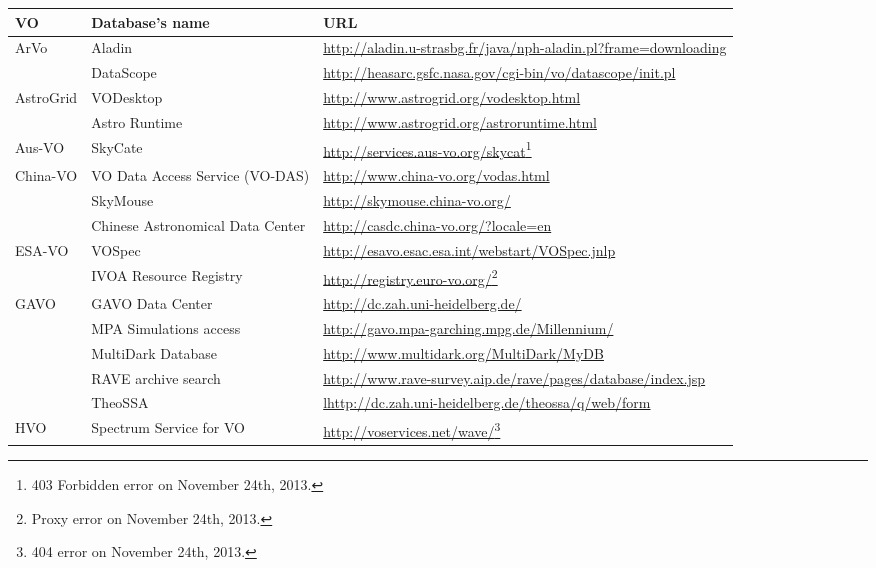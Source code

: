 \begin{table*}[h!t]
    \centering
    \begin{tabular}{|l|p{9cm}|p{6cm}|}
    \hline
    \textbf{VO} & \textbf{Database's name} & \textbf{URL} \\
    \hline
    \multirow{2}{*}{ArVo} & Aladin
    & \url{http://aladin.u-strasbg.fr/java/nph-aladin.pl?frame=downloading} \\
    \cline{2-3}
     & DataScope
     & \url{http://heasarc.gsfc.nasa.gov/cgi-bin/vo/datascope/init.pl} \\
     \hline
    \multirow{2}{*}{AstroGrid} & VODesktop
    & \url{http://www.astrogrid.org/vodesktop.html}\\
    \cline{2-3}
     & Astro Runtime & \url{http://www.astrogrid.org/astroruntime.html} \\
     \hline
    Aus-VO & SkyCate
    & \url{http://services.aus-vo.org/skycat}\footnote{403 Forbidden error on November 24th, 2013.} \\ 
    \hline
    \multirow{3}{*}{China-VO} & VO Data Access Service (VO-DAS)
    & \url{http://www.china-vo.org/vodas.html} \\
    \cline{2-3}
     & SkyMouse & \url{http://skymouse.china-vo.org/} \\
     \cline{2-3}
     & Chinese Astronomical Data Center 
     & \url{http://casdc.china-vo.org/?locale=en} \\
     \hline
    \multirow{2}{*}{ESA-VO} & VOSpec
    & \url{http://esavo.esac.esa.int/webstart/VOSpec.jnlp} \\
     \cline{2-3}
     & IVOA Resource Registry
     & \url{http://registry.euro-vo.org/}\footnote{Proxy error on November 24th, 2013.} \\
     \hline
    \multirow{5}{*}{GAVO} & GAVO Data Center
    & \url{http://dc.zah.uni-heidelberg.de/} \\
    \cline{2-3}
     & MPA Simulations access
     & \url{http://gavo.mpa-garching.mpg.de/Millennium/} \\
     \cline{2-3}
     & MultiDark Database
     & \url{http://www.multidark.org/MultiDark/MyDB} \\
     \cline{2-3}
     & RAVE archive search
     & \url{http://www.rave-survey.aip.de/rave/pages/database/index.jsp} \\
     \cline{2-3}
     & TheoSSA
     & \url{lhttp://dc.zah.uni-heidelberg.de/theossa/q/web/form} \\
     \hline
    \multirow{2}{*}{HVO} & Spectrum Service for VO
    & \url{http://voservices.net/wave/}\footnote{404 error on November 24th, 2013.} \\

\end{tabular}
\end{table*}

